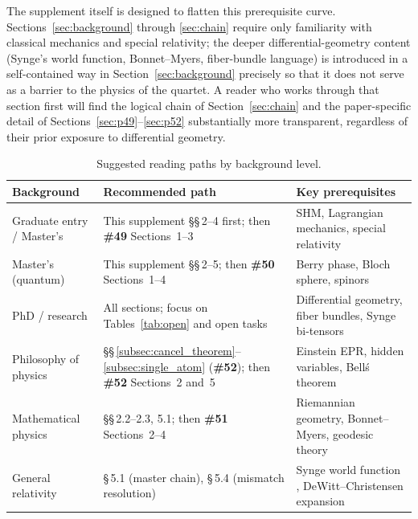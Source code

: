 \documentclass[12pt,letterpaper]{article}
\newcommand{\paperno}[1]{\textbf{\#{}#1}}
\begin{document}
The supplement itself is designed to flatten this prerequisite curve. Sections~\ref{sec:background} through \ref{sec:chain} require only familiarity with classical mechanics and special relativity; the deeper differential-geometry content (Synge's world function, Bonnet--Myers, fiber-bundle language) is introduced in a self-contained way in Section~\ref{sec:background} precisely so that it does not serve as a barrier to the physics of the quartet. A reader who works through that section first will find the logical chain of Section~\ref{sec:chain} and the paper-specific detail of Sections~\ref{sec:p49}--\ref{sec:p52} substantially more transparent, regardless of their prior exposure to differential geometry.

\begin{table}[h!]
\centering
\renewcommand{\arraystretch}{1.4}
\begin{tabular}{p{3.5cm}p{5.5cm}p{4.5cm}}
\toprule
\textbf{Background} & \textbf{Recommended path} & \textbf{Key prerequisites} \\
\midrule
Graduate entry / Master's &
  This supplement \S\S\,2--4 first; then \paperno{49} Sections~1--3 &
  SHM, Lagrangian mechanics, special relativity \\
\addlinespace[0.3cm]
Master's (quantum) &
  This supplement \S\S\,2--5; then \paperno{50} Sections~1--4 &
  Berry phase, Bloch sphere, spinors \\
\addlinespace[0.3cm]
PhD / research &
  All sections; focus on Tables~\ref{tab:open} and open tasks &
  Differential geometry, fiber bundles, Synge bi-tensors \\
\addlinespace[0.3cm]
Philosophy of physics &
  \S\S\,\ref{subsec:cancel_theorem}--\ref{subsec:single_atom} (\paperno{52}); then \paperno{52} Sections~2 and~5 &
  Einstein EPR, hidden variables, Bell\'s theorem \\
\addlinespace[0.3cm]
Mathematical physics &
  \S\S\,2.2--2.3, 5.1; then \paperno{51} Sections~2--4 &
  Riemannian geometry, Bonnet--Myers, geodesic theory \\
\addlinespace[0.3cm]
General relativity &
  \S\,5.1 (master chain), \S\,5.4 (mismatch resolution) &
  Synge world function \cite{Synge1960},
  DeWitt--Christensen expansion \cite{DeWitt1965} \\
\bottomrule
\end{tabular}
\caption{Suggested reading paths by background level.}
\label{tab:reading}
\end{table}
\end{document}
